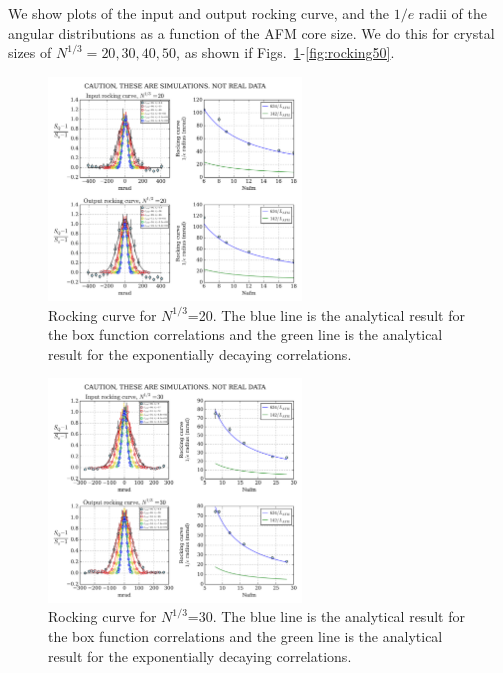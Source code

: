 \documentclass[11pt,letter]{article}
\begin{document}
We show plots of the input and output rocking curve, and the $1/e$ radii of the
angular distributions as a function of the AFM core size.  We do this for
crystal sizes of $N^{1/3} = 20, 30, 40, 50$, as shown if
Figs.~\ref{fig:rocking20}-\ref{fig:rocking50}.   
\begin{figure}
\centering \includegraphics[width=0.6\textwidth]{figures_140308/Rocking_20.png}
\caption[Rocking curve for $N^{1/3}$=20]{\small Rocking curve for $N^{1/3}$=20.
The blue line is the analytical result for the box function correlations and
the green line is the analytical result for the exponentially decaying
correlations.  }
\label{fig:rocking20}
\end{figure}
\begin{figure}
\centering \includegraphics[width=0.6\textwidth]{figures_140308/Rocking_30.png}
\caption[Rocking curve for $N^{1/3}$=30]{\small Rocking curve for $N^{1/3}$=30.
The blue line is the analytical result for the box function correlations and
the green line is the analytical result for the exponentially decaying
correlations.  }
\label{fig:rocking30}
\end{figure}
\end{document}
